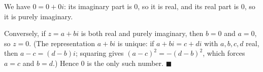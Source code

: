 We have $0=0+0i$: its imaginary part is $0$, so it is real, and its real part is $0$, so it is purely imaginary.

Conversely, if $z=a+bi$ is both real and purely imaginary, then $b=0$ and $a=0$, so $z=0$. (The representation $a+bi$ is unique: if $a+bi=c+di$ with $a,b,c,d$ real, then $a-c=(d-b)i$; squaring gives $(a-c)^2=-(d-b)^2$, which forces $a=c$ and $b=d$.) Hence $\boxed{0}$ is the only such number. $\blacksquare$
